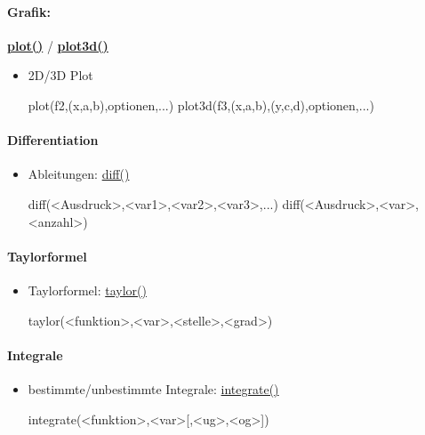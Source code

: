 \documentclass[a4paper,9pt,DIV15,twocolumn]{scrartcl}
\begin{document}
{\paragraph{Grafik:}\href{https://sage.math.uni-goettingen.de/doc/static/reference/sage/combinat/e_one_star.html?highlight=.plot#sage.combinat.e_one_star.Patch.plot}{\textbf{plot()}}	/	\href{https://sage.math.uni-goettingen.de/doc/static/reference/sage/combinat/e_one_star.html?highlight=.plot#sage.combinat.e_one_star.Patch.plot3d}{\textbf{plot3d()}}
\begin{itemize}
\item 2D/3D Plot
\begin{sagein}
plot(f2,(x,a,b),optionen,...)
plot3d(f3,(x,a,b),(y,c,d),optionen,...)
\end{sagein}
\end{itemize}

\paragraph{Differentiation}
\begin{itemize}
 \item Ableitungen: \href{https://sage.math.uni-goettingen.de/doc/static/reference/sage/calculus/functional.html?highlight=diff#sage.calculus.functional.diff}{diff()}
\begin{sagein}
diff(<Ausdruck>,<var1>,<var2>,<var3>,...)
diff(<Ausdruck>,<var>,<anzahl>) 
\end{sagein}
\end{itemize}

\paragraph{Taylorformel}
\begin{itemize}
 \item Taylorformel: \href{https://sage.math.uni-goettingen.de/doc/static/reference/sage/calculus/functional.html?highlight=diff#sage.calculus.functional.integral}{taylor()}

\begin{sagein}
taylor(<funktion>,<var>,<stelle>,<grad>)
\end{sagein}
\end{itemize}

\paragraph{Integrale}
\begin{itemize}
\item bestimmte/unbestimmte Integrale: \href{https://sage.math.uni-goettingen.de/doc/static/reference/sage/calculus/functional.html?highlight=diff#sage.calculus.functional.integral}{integrate()}
\begin{sagein}
integrate(<funktion>,<var>[,<ug>,<og>]) 
\end{sagein}
\end{itemize}

}
\end{document}
